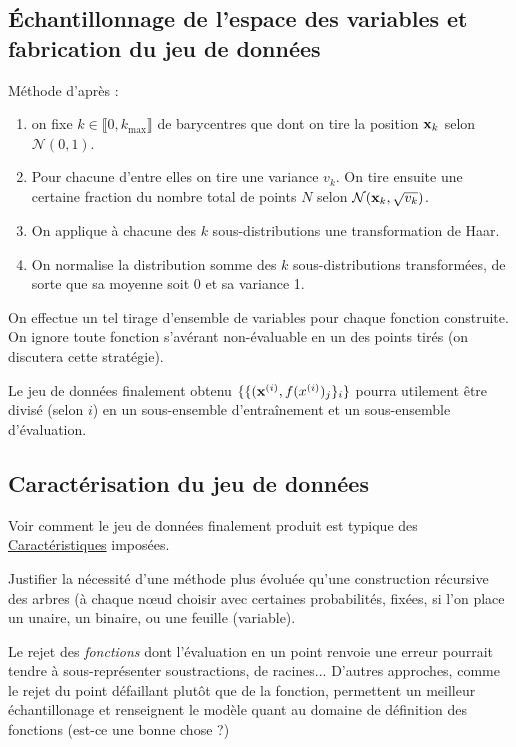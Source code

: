 \documentclass[a4paper,12pt]{article}
\begin{document}
\subsection{{\color{mygreen}Échantillonnage de l'espace des variables et fabrication du jeu de données}}

Méthode d'après \cite{kamienny} :

\begin{enumerate}
    \item on fixe $k \in \llbracket 0, k_{\text{max}}\rrbracket$ de barycentres que dont on tire la position $\vb x_k$ selon $\mathcal N(0, 1)$.
    \item Pour chacune d'entre elles on tire une variance $v_k$. On tire ensuite une certaine fraction du nombre total de points $N$ selon $\mathcal N(\vb x_k, \sqrt{v_k})$. 
    \item On applique à chacune des $k$ sous-distributions une transformation de Haar.
    \item On normalise la distribution somme des $k$ sous-distributions transformées, de sorte que sa moyenne soit 0 et sa variance 1.
\end{enumerate}

On effectue un tel tirage d'ensemble de variables pour chaque fonction construite. On ignore toute fonction s'avérant non-évaluable en un des points tirés (on discutera cette stratégie).

\bigskip

Le jeu de données finalement obtenu $\{\{(\vb x^{(i)}, f(x^{(i)})_j\}_i\}$ pourra utilement être divisé (selon $i$) en un sous-ensemble d'entraînement et un sous-ensemble d'évaluation.

\subsection{{\color{orange}Caractérisation du jeu de données}}

Voir comment le jeu de données finalement produit est typique des \hyperref[sec:carac]{Caractéristiques} imposées.

Justifier la nécessité d'une méthode plus évoluée qu'une construction récursive des arbres (à chaque nœud choisir avec certaines probabilités, fixées, si l'on place un unaire, un binaire, ou une feuille (variable).

Le rejet des \emph{fonctions} dont l'évaluation en un point renvoie une erreur pourrait tendre à sous-représenter soustractions, de racines... D'autres approches, comme le rejet du point défaillant plutôt que de la fonction, permettent un meilleur échantillonage et renseignent le modèle quant au domaine de définition des fonctions {\color{blue} (est-ce une bonne chose ?)}
\end{document}
